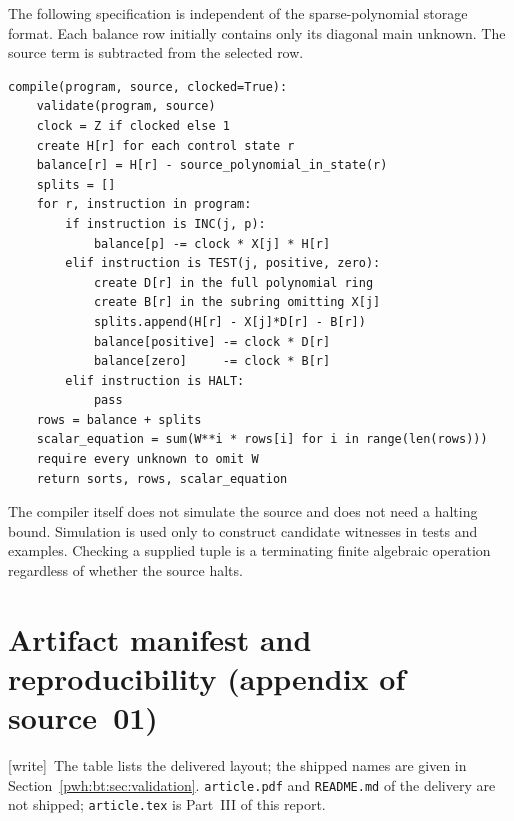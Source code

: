 \documentclass[11pt,letterpaper]{article}
\numberwithin{equation}{section}
\theoremstyle{definition}
\newcommand{\wtag}{\textup{[write]}}
\begin{document}
The following specification is independent of the sparse-polynomial
storage format. Each balance row initially contains only its diagonal
main unknown. The source term is subtracted from the selected row.
\begin{lstlisting}
compile(program, source, clocked=True):
    validate(program, source)
    clock = Z if clocked else 1
    create H[r] for each control state r
    balance[r] = H[r] - source_polynomial_in_state(r)
    splits = []
    for r, instruction in program:
        if instruction is INC(j, p):
            balance[p] -= clock * X[j] * H[r]
        elif instruction is TEST(j, positive, zero):
            create D[r] in the full polynomial ring
            create B[r] in the subring omitting X[j]
            splits.append(H[r] - X[j]*D[r] - B[r])
            balance[positive] -= clock * D[r]
            balance[zero]     -= clock * B[r]
        elif instruction is HALT:
            pass
    rows = balance + splits
    scalar_equation = sum(W**i * rows[i] for i in range(len(rows)))
    require every unknown to omit W
    return sorts, rows, scalar_equation
\end{lstlisting}
The compiler itself does not simulate the source and does not need a
halting bound. Simulation is used only to construct candidate witnesses
in tests and examples. Checking a supplied tuple is a terminating
finite algebraic operation regardless of whether the source halts.

\section{Artifact manifest and reproducibility (appendix of source~01)}\label{pwh:bt:app:manifest}

\wtag\ The table lists the delivered layout; the shipped names are given in Section~\ref{pwh:bt:sec:validation}. \texttt{article.pdf} and \texttt{README.md} of the delivery are not shipped; \texttt{article.tex} is Part~III of this report.
\end{document}

